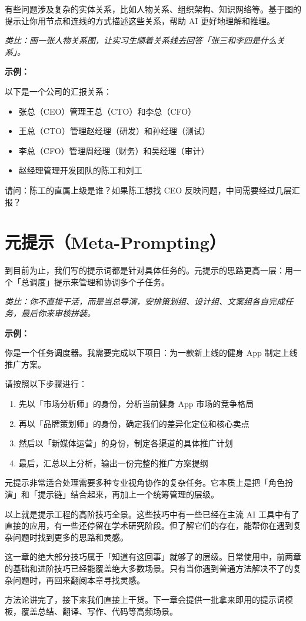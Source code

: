 有些问题涉及复杂的实体关系，比如人物关系、组织架构、知识网络等。基于图的提示让你用节点和连线的方式描述这些关系，帮助 AI 更好地理解和推理。

\textit{类比：画一张人物关系图，让实习生顺着关系线去回答「张三和李四是什么关系」。}

\textbf{示例：}

\begin{promptbox}
以下是一个公司的汇报关系：
\begin{itemize}
  \item 张总（CEO）管理王总（CTO）和李总（CFO）
  \item 王总（CTO）管理赵经理（研发）和孙经理（测试）
  \item 李总（CFO）管理周经理（财务）和吴经理（审计）
  \item 赵经理管理开发团队的陈工和刘工
\end{itemize}

请问：陈工的直属上级是谁？如果陈工想找 CEO 反映问题，中间需要经过几层汇报？
\end{promptbox}

\section{元提示（Meta-Prompting）}

到目前为止，我们写的提示词都是针对具体任务的。元提示的思路更高一层：用一个「总调度」提示来管理和协调多个子任务。

\textit{类比：你不直接干活，而是当总导演，安排策划组、设计组、文案组各自完成任务，最后你来审核拼装。}

\textbf{示例：}

\begin{promptbox}
你是一个任务调度器。我需要完成以下项目：为一款新上线的健身 App 制定上线推广方案。

请按照以下步骤进行：
\begin{enumerate}
  \item 先以「市场分析师」的身份，分析当前健身 App 市场的竞争格局
  \item 再以「品牌策划师」的身份，确定我们的差异化定位和核心卖点
  \item 然后以「新媒体运营」的身份，制定各渠道的具体推广计划
  \item 最后，汇总以上分析，输出一份完整的推广方案提纲
\end{enumerate}
\end{promptbox}

元提示非常适合处理需要多种专业视角协作的复杂任务。它本质上是把「角色扮演」和「提示链」结合起来，再加上一个统筹管理的层级。

\bigskip

以上就是提示工程的高阶技巧全景。这些技巧中有一些已经在主流 AI 工具中有了直接的应用，有一些还停留在学术研究阶段。但了解它们的存在，能帮你在遇到复杂问题时找到更多的思路和灵感。

\begin{tipbox}
这一章的绝大部分技巧属于「知道有这回事」就够了的层级。日常使用中，前两章的基础和进阶技巧已经能覆盖绝大多数场景。只有当你遇到普通方法解决不了的复杂问题时，再回来翻阅本章寻找灵感。
\end{tipbox}

方法论讲完了，接下来我们直接上干货。下一章会提供一批拿来即用的提示词模板，覆盖总结、翻译、写作、代码等高频场景。
